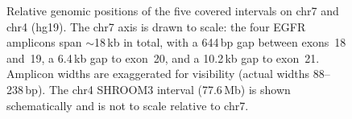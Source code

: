 \begin{figure}[H]
\caption{Relative genomic positions of the five covered intervals on chr7 and chr4 (hg19).
  The chr7 axis is drawn to scale: the four EGFR amplicons span $\sim$18\,kb in total,
  with a 644\,bp gap between exons~18 and~19, a 6.4\,kb gap to exon~20, and a 10.2\,kb gap
  to exon~21. Amplicon widths are exaggerated for visibility (actual widths 88--238\,bp).
  The chr4 SHROOM3 interval (77.6\,Mb) is shown schematically and is not to scale
  relative to chr7.}
\label{fig:amplicon-positions}
\end{figure}
